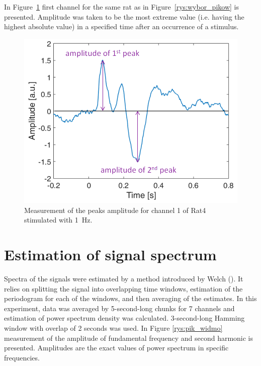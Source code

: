 \documentclass{pracalicmgr}
\begin{document}
   In Figure~\ref{rys:amplitude} first channel for the same rat as in Figure~\ref{rys:wybor_pikow} is presented. Amplitude was taken to be the most extreme value (i.e. having the highest absolute value) in a specified time after an occurrence of a stimulus.
   \begin{figure}[H]
   	\begin{center}
   		\includegraphics[scale=0.5]{amplitude2.png}
   	\end{center}
   	\caption{Measurement of the peaks amplitude for channel 1 of Rat4 stimulated with 1~Hz. }
   	\label{rys:amplitude}
   \end{figure} 
   
   
   \section{Estimation of signal spectrum}
   Spectra of the signals were estimated by a method introduced by Welch (\cite{welch}). It relies  on splitting the signal into overlapping time windows, estimation of the periodogram for each of the windows, and then averaging of the estimates. In this experiment, data was averaged by 5-second-long chunks for 7 channels and estimation of power spectrum density was calculated. 3-second-long Hamming window with overlap of 2 seconds was used. In Figure \ref{rys:pik_widmo} measurement of the amplitude of fundamental frequency and second harmonic is presented. Amplitudes are the exact values of power spectrum in specific frequencies. 
   
\end{document}
